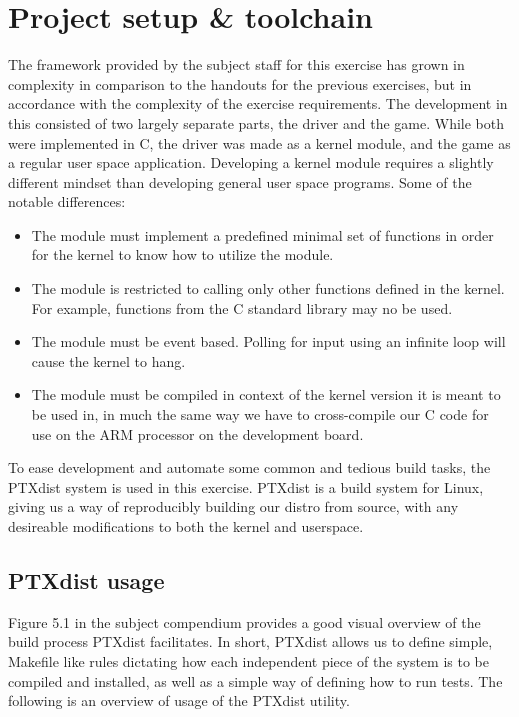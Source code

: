 \section{Project setup \& toolchain}
\label{project-setup-toolchain}

The framework provided by the subject staff for this exercise has grown in complexity in comparison to the handouts for the previous exercises, but in accordance with the complexity of the exercise requirements.
The development in this consisted of two largely separate parts, the driver and the game. While both were implemented in C, the driver was made as a kernel module, and the game as a regular user space application. Developing a kernel module requires a slightly different mindset than developing general user space programs. Some of the notable differences:

\begin{itemize}
\item The module must implement a predefined minimal set of functions in order for the kernel to know how to utilize the module.
\item The module is restricted to calling only other functions defined in the kernel. For example, functions from the C standard library may no be used.
\item The module must be event based. Polling for input using an infinite loop will cause the kernel to hang.
\item The module must be compiled in context of the kernel version it is meant to be used in, in much the same way we have to cross-compile our C code for use on the ARM processor on the development board.
\end{itemize}

To ease development and automate some common and tedious build tasks, the PTXdist system is used in this exercise. PTXdist is a build system for Linux, giving us a way of reproducibly building our distro from source, with any desireable modifications to both the kernel and userspace.

\subsection{PTXdist usage}
\label{ptxdist-usage}

Figure 5.1 in the subject compendium \cite[p.~48]{compendium} provides a good visual overview of the build process PTXdist facilitates. In short, PTXdist allows us to define simple, Makefile like rules dictating how each independent piece of the system is to be compiled and installed, as well as a simple way of defining how to run tests. The following is an overview of usage of the PTXdist utility.

